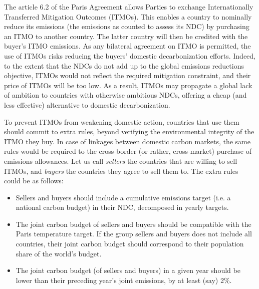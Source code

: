 \documentclass[12pt,english]{article}
\begin{document}
The article 6.2 of the Paris Agreement allows Parties to exchange Internationally Transferred Mitigation Outcomes (ITMOs). This enables a country to nominally reduce its emissions (the emissions as counted to assess its NDC) by purchasing an ITMO to another country. The latter country will then be credited with the buyer's ITMO emissions. As any bilateral agreement on ITMO is permitted, the use of ITMOs risks reducing the buyers' domestic decarbonization efforts. %
Indeed, to the extent that the NDCs do not add up to the global emissions reductions objective, ITMOs would not reflect the required mitigation constraint, and their price of ITMOs will be too low. As a result, ITMOs may propagate a global lack of ambition to countries with otherwise ambitious NDCs, offering a cheap (and less effective) alternative to domestic decarbonization. 

To prevent ITMOs from weakening domestic action, countries that use them should commit to extra rules, beyond verifying the environmental integrity of the ITMO they buy. In case of linkages between domestic carbon markets, the same rules would be required to the cross-border (or rather, cross-market) purchase of emissions allowances. Let us call \textit{sellers} the countries that are willing to sell ITMOs, and \textit{buyers} the countries they agree to sell them to. The extra rules could be as follows: 
\begin{itemize}
  \item Sellers and buyers should include a cumulative emissions target (i.e. a national carbon budget) in their NDC, decomposed in yearly targets.
  \item The joint carbon budget of sellers and buyers should be compatible with the Paris temperature target. If the group sellers and buyers does not include all countries, their joint carbon budget should correspond to their population share of the world's budget.
  \item The joint carbon budget (of sellers and buyers) in a given year should be lower than their preceding year's joint emissions, by at least (say) 2\%.
\end{itemize}
\end{document}
